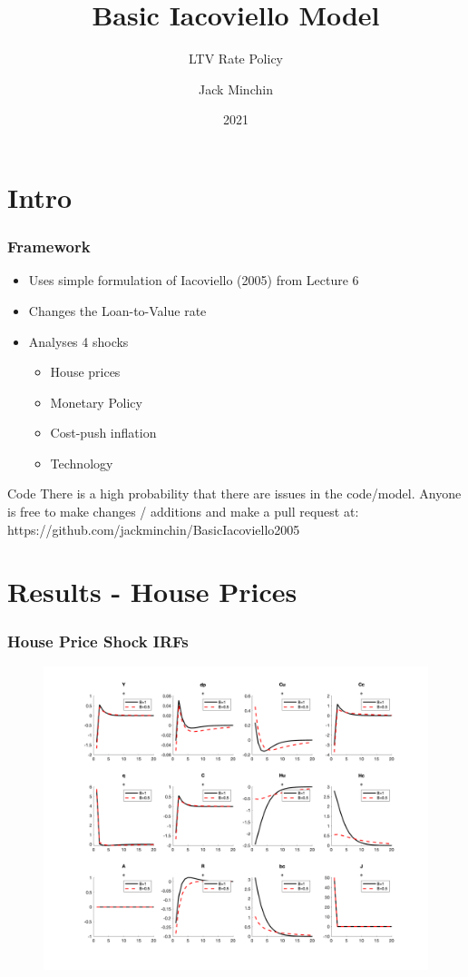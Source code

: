 \documentclass{beamer}
\title{Basic Iacoviello Model}
\subtitle{LTV Rate Policy}
\author{Jack Minchin}
\date{2021}
\begin{document}
\frame{\titlepage}

\section{Intro}

\begin{frame}
\frametitle{Framework}
\begin{itemize}
  \item Uses simple formulation of Iacoviello (2005) from Lecture 6
  \item Changes the Loan-to-Value rate
  \item Analyses 4 shocks
 	\begin{itemize}
  		\item House prices
  		\item Monetary Policy
  		\item Cost-push inflation
  		\item Technology
	\end{itemize}
\end{itemize}

\begin{block}{Code}
There is a high probability that there are issues in the code/model. Anyone is free to make changes / additions and make a pull request at:
https://github.com/jackminchin/BasicIacoviello2005
\end{block}

\end{frame}

\section{Results - House Prices}

\begin{frame}
	\frametitle{House Price Shock IRFs}
	
	\begin{figure}[H]\centering
  \includegraphics[scale=0.3]{../figs/_e}
\end{figure}
	
\end{frame}
\end{document}
